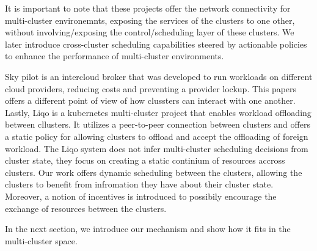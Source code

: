 It is important to note that these projects offer the network connectivity for
multi-cluster environemnts, exposing the services of the clusters to one other,
without involving/exposing the control/scheduling layer of these clusters. We
later introduce cross-cluster scheduling capabilities steered by  actionable
policies to enhance the performance of multi-cluster environments.

Sky pilot is an intercloud broker that was developed to run workloads on
different cloud providers, reducing costs and preventing a provider lockup.
This papers offers a different point of view of how clussters can interact with
one another. 
Lastly, Liqo is a kubernetes multi-cluster project that enables workload
offloading between cllusters. It utilizes a peer-to-peer connection between
clusters and offers a static policy for allowing clusters to offload and accept
the offloading of foreign workload. The Liqo system does not infer
multi-cluster scheduling decisions from cluster state, they focus on creating a
static continium of resources accross clusters. Our work offers dynamic
scheduling between the clusters, allowing the clusters to benefit from
infromation they have about their cluster state. Moreover, a notion of
incentives is introduced to possibily encourage the exchange of resources
between the clusters.  

In the next section, we introduce our mechanism and show how it fits in the
multi-cluster space.
